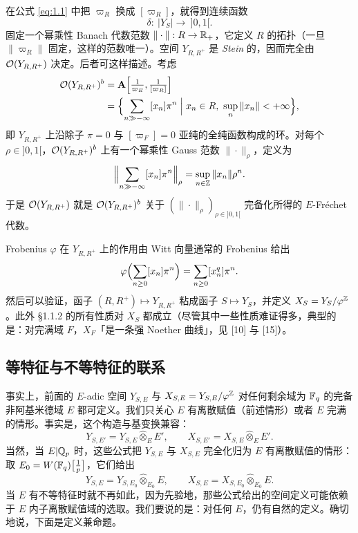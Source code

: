 在公式 \eqref{eq:1.1} 中把 $\varpi_R$ 换成 $[\varpi_R]$，就得到连续函数
\[
  \delta:\ |Y_S|\longrightarrow\ ]0,1[.
\]
固定一个幂乘性 Banach 代数范数 $\|\cdot\|:R\to\mathbb{R}_+$，它定义 $R$ 的拓扑（一旦 $\|\varpi_R\|$ 固定，这样的范数唯一）。空间 $Y_{R,R^+}$ 是 \emph{Stein} 的，因而完全由 $\mathcal{O}(Y_{R,R^+})$ 决定。后者可这样描述。考虑
\[
\begin{aligned}
  \cO(Y_{R,R^+})^b &= \mathbf{A}\Bigl[\tfrac{1}{\varpi_E},\tfrac{1}{[\varpi_R]}\Bigr]\\
  &= \Bigl\{\sum_{n\gg-\infty}[x_n]\pi^n \;\Big|\; x_n\in R,\ \sup_n\|x_n\|<+\infty\Bigr\},
\end{aligned}
\]
即 $Y_{R,R^+}$ 上沿除子 $\pi=0$ 与 $[\varpi_F]=0$ 亚纯的全纯函数构成的环。对每个 $\rho\in]0,1[$，$\mathcal{O}(Y_{R,R^+})^b$ 上有一个幂乘性 Gauss 范数 $\|\cdot\|_\rho$，定义为
\[
  \Bigl\|\sum_{n\gg-\infty}[x_n]\pi^n\Bigr\|_\rho=\sup_{n\in\mathbb{Z}}\|x_n\|\rho^n.
\]
于是 $\mathcal{O}(Y_{R,R^+})$ 就是 $\mathcal{O}(Y_{R,R^+})^b$ 关于 $(\|\cdot\|_\rho)_{\rho\in]0,1[}$ 完备化所得的 $E$-Fréchet 代数。

Frobenius $\varphi$ 在 $Y_{R,R^+}$ 上的作用由 Witt 向量通常的 Frobenius 给出
\[
  \varphi\Bigl(\sum_{n\ge0}[x_n]\pi^n\Bigr)=\sum_{n\ge0}[x_n^q]\pi^n.
\]
然后可以验证，函子 $(R,R^+)\mapsto Y_{R,R^+}$ 粘成函子 $S\mapsto Y_S$，并定义 $X_S=Y_S/\varphi^{\mathbb{Z}}$。此外 §1.1.2 的所有性质对 $X_S$ 都成立（尽管其中一些性质难证得多，典型的是：对完满域 $F$，$X_F$「是一条强 Noether 曲线」，见 [10] 与 [15]）。

\subsection{等特征与不等特征的联系}%

\leavevmode{}事实上，前面的 $E$-adic 空间 $Y_{S,E}$ 与 $X_{S,E}=Y_{S,E}/\varphi^{\mathbb{Z}}$ 对任何剩余域为 $\mathbb{F}_q$ 的完备非阿基米德域 $E$ 都可定义。我们只关心 $E$ 有离散赋值（前述情形）或者 $E$ 完满的情形。事实是，这个构造与基变换兼容：
\[
  Y_{S,E'}=Y_{S,E}\hat\otimes_EE',\qquad X_{S,E'}=X_{S,E}\hat\otimes_EE'.
\]
当然，当 $E|\mathbb{Q}_p$ 时，这些公式把 $Y_{S,E}$ 与 $X_{S,E}$ 完全化归为 $E$ 有离散赋值的情形：取 $E_0=W(\mathbb{F}_q)\bigl[\tfrac1p\bigr]$，它们给出
\[
  Y_{S,E}=Y_{S,E_0}\hat\otimes_{E_0}E,\qquad X_{S,E}=X_{S,E_0}\hat\otimes_{E_0}E.
\]
当 $E$ 有不等特征时就不再如此，因为先验地，那些公式给出的空间定义可能依赖于 $E$ 内子离散赋值域的选取。我们要说的是：对任何 $E$，仍有自然的定义。确切地说，下面是定义兼命题。

